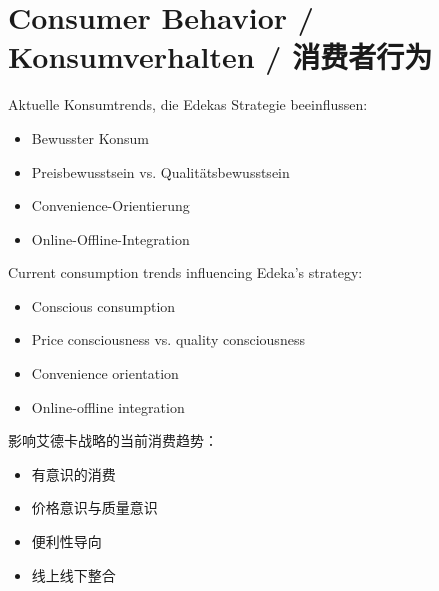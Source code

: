 \section{Consumer Behavior / Konsumverhalten / 消费者行为}

\begin{otherlanguage}{ngerman}
Aktuelle Konsumtrends, die Edekas Strategie beeinflussen:
\begin{itemize}
    \item Bewusster Konsum
    \item Preisbewusstsein vs. Qualitätsbewusstsein
    \item Convenience-Orientierung
    \item Online-Offline-Integration
\end{itemize}
\end{otherlanguage}

Current consumption trends influencing Edeka's strategy:
\begin{itemize}
    \item Conscious consumption
    \item Price consciousness vs. quality consciousness
    \item Convenience orientation
    \item Online-offline integration
\end{itemize}

影响艾德卡战略的当前消费趋势：
\begin{itemize}
    \item 有意识的消费
    \item 价格意识与质量意识
    \item 便利性导向
    \item 线上线下整合
\end{itemize}
